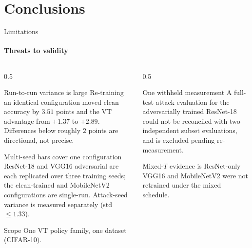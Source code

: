\documentclass[aspectratio=169,11pt]{beamer}
\begin{document}
\section{Conclusions}
\begin{frame}{Limitations}\framesubtitle{Threats to validity}
\scriptsize
\begin{columns}[T]
\begin{column}{0.5\textwidth}
\begin{block}{Run-to-run variance is large}
Re-training an identical configuration moved clean accuracy by $3.51$ points and the
VT advantage from $+1.37$ to $+2.89$. Differences below roughly $2$ points are
directional, not precise.
\end{block}
\vspace{0.25em}
\begin{block}{Multi-seed bars cover one configuration}
ResNet-18 and VGG16 adversarial are each replicated over three training seeds; the
clean-trained and MobileNetV2 configurations are single-run. Attack-seed variance is measured separately (std $\le 1.33$).
\end{block}
\vspace{0.25em}
\begin{block}{Scope}
One VT policy family, one dataset (CIFAR-10).
\end{block}
\end{column}
\begin{column}{0.5\textwidth}
\begin{block}{One withheld measurement}
A full-test attack evaluation for the adversarially trained ResNet-18 could not be
reconciled with two independent subset evaluations, and is excluded pending
re-measurement.
\end{block}
\vspace{0.25em}
\begin{block}{Mixed-$T$ evidence is ResNet-only}
VGG16 and MobileNetV2 were not retrained under the mixed schedule.
\end{block}
\end{column}
\end{columns}
\end{frame}
\end{document}
